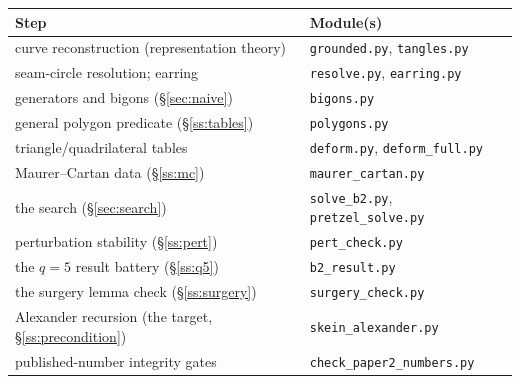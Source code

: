 \documentclass[11pt,reqno]{amsart}
\theoremstyle{plain}
\theoremstyle{definition}
\begin{document}
\begin{center}
\begin{tabular}{ll}
\toprule
Step & Module(s)\\
\midrule
curve reconstruction (representation theory) & \texttt{grounded.py}, \texttt{tangles.py}\\
seam-circle resolution; earring & \texttt{resolve.py}, \texttt{earring.py}\\
generators and bigons (\S\ref{sec:naive}) & \texttt{bigons.py}\\
general polygon predicate (\S\ref{ss:tables}) & \texttt{polygons.py}\\
triangle/quadrilateral tables & \texttt{deform.py}, \texttt{deform\_full.py}\\
Maurer--Cartan data (\S\ref{ss:mc}) & \texttt{maurer\_cartan.py}\\
the search (\S\ref{sec:search}) & \texttt{solve\_b2.py}, \texttt{pretzel\_solve.py}\\
perturbation stability (\S\ref{ss:pert}) & \texttt{pert\_check.py}\\
the $q=5$ result battery (\S\ref{ss:q5}) & \texttt{b2\_result.py}\\
the surgery lemma check (\S\ref{ss:surgery}) & \texttt{surgery\_check.py}\\
Alexander recursion (the target, \S\ref{ss:precondition}) & \texttt{skein\_alexander.py}\\
published-number integrity gates & \texttt{check\_paper2\_numbers.py}\\
\bottomrule
\end{tabular}
\end{center}
\end{document}
